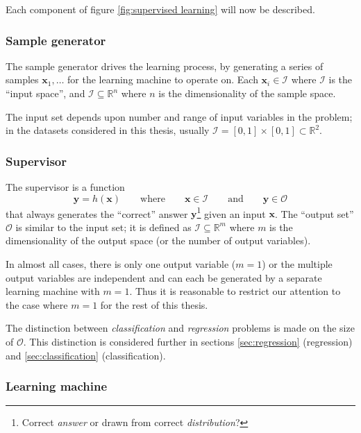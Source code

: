Each component of figure \ref{fig:supervised learning} will now be
described.


\subsubsection{Sample generator}
\label{sec:sample generator}

The sample generator drives the learning process, by generating a
series of samples $\mathbf{x}_1, \ldots$ for the learning machine to
operate on.  Each $\mathbf{x}_i \in \mathcal{I}$ where $\mathcal{I}$
is the ``input space'', and $\mathcal{I} \subseteq \mathbb{R}^n$ where
$n$ is the dimensionality of the sample space.

The input set depends upon number and range of input variables in the
problem; in the datasets considered in this thesis, usually
$\mathcal{I} = [0,1] \times [0,1] \subset \mathbb{R}^2$.


\subsubsection{Supervisor}
\label{sec:supervisor}

The supervisor is a function
%
\begin{equation}
\mathbf{y} = h(\mathbf{x}) \qquad \mbox{where} \qquad \mathbf{x} \in
\mathcal{I} \qquad \mbox{and} \qquad \mathbf{y} \in \mathcal{O}
\label{eqn:supervisor}
\end{equation}
%
that always generates the ``correct'' answer
$\mathbf{y}$\footnote{Correct \emph{answer} or drawn from correct
\emph{distribution}?} given an input $\mathbf{x}$.  The ``output set''
$\mathcal{O}$ is similar to the input set; it is defined as $\mathcal{I}
\subseteq \mathbb{R}^m$ where $m$ is the dimensionality of the output
space (or the number of output variables).

In almost all cases, there is only one output variable ($m=1$) or the
multiple output variables are independent and can each
be generated by a separate learning machine with $m=1$.
Thus it is reasonable to restrict our attention to the case where
$m=1$ for the rest of this thesis.

The distinction between \emph{classification} and \emph{regression}
problems is made on the size of $\mathcal{O}$.  This distinction is 
considered further in sections \ref{sec:regression} (regression) and
\ref{sec:classification} (classification).


\subsubsection{Learning machine}
\label{sec:learning machine}

